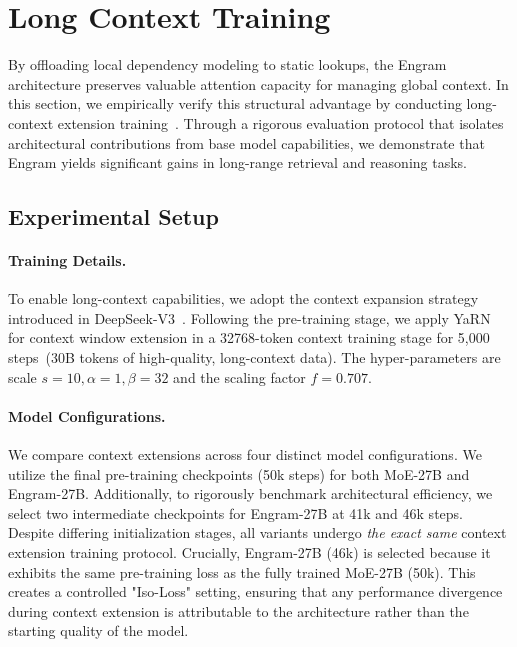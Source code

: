 \section{Long Context Training}
\label{sec:long_ctx}

By offloading local dependency modeling to static lookups, the Engram architecture preserves valuable attention capacity for managing global context. In this section, we empirically verify this structural advantage by conducting long-context extension training~\citep{gao2025train,peng2023yarn}. Through a rigorous evaluation protocol that isolates architectural contributions from base model capabilities, we demonstrate that Engram yields significant gains in long-range retrieval and reasoning tasks.

\subsection{Experimental Setup}

\paragraph{Training Details.} To enable long-context capabilities, we adopt the context expansion strategy introduced in DeepSeek-V3~\citep{liu2024deepseek}. Following the pre-training stage, we apply YaRN~\citep{peng2023yarn} for context window extension in a 32768-token context training stage for 5,000 steps~(30B tokens of high-quality, long-context data). The hyper-parameters are scale $s=10, \alpha=1,\beta=32$ and the scaling factor $f=0.707$.

\paragraph{Model Configurations.} We compare context extensions across four distinct model configurations. We utilize the final pre-training checkpoints (50k steps) for both MoE-27B and Engram-27B. Additionally, to rigorously benchmark architectural efficiency, we select two intermediate checkpoints for Engram-27B at 41k and 46k steps. 
Despite differing initialization stages, all variants undergo \textit{the exact same} context extension training protocol.
Crucially, Engram-27B (46k) is selected because it exhibits the same pre-training loss as the fully trained MoE-27B (50k). This creates a controlled "Iso-Loss" setting, ensuring that any performance divergence during context extension is attributable to the architecture rather than the starting quality of the model.

